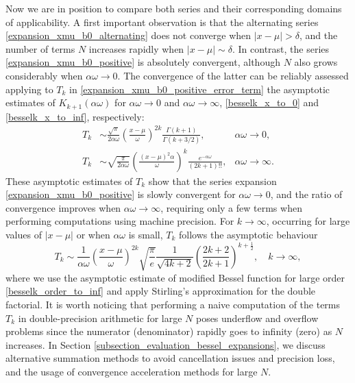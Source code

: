 \documentclass[10pt,a4paper,oneside]{article}
\numberwithin{equation}{section}
\begin{document}
Now we are in position to compare both series and their corresponding domains of applicability. A first important observation is that the alternating series \eqref{expansion_xmu_b0_alternating} does not converge when $|x - \mu| > \delta$, and the number of terms $N$ increases rapidly when $|x - \mu| \sim \delta$. In contrast, the series \eqref{expansion_xmu_b0_positive} is absolutely convergent, although $N$ also grows considerably when $\alpha\omega \to 0$. The convergence of the latter can be reliably assessed applying to $T_k$ in \eqref{expansion_xmu_b0_positive_error_term} the asymptotic estimates of $K_{k+1}(\alpha\omega)$ for $\alpha \omega \to 0$ and $\alpha \omega \to \infty$, \eqref{besselk_x_to_0} and \eqref{besselk_x_to_inf}, respectively:
\begin{align*}
T_k &\sim \frac{\sqrt{\pi}}{2\alpha\omega} \left(\frac{x-\mu}{\omega}\right)^{2k}\frac{\Gamma(k + 1)}{\Gamma(k + 3/2)}, & \alpha\omega \to 0,\\
T_k &\sim \sqrt{\frac{\pi}{2\alpha \omega}} \left(\frac{(x-\mu)^2\alpha}{\omega}\right)^k \frac{e^{-\alpha \omega}}{(2k + 1)!!}, &\alpha\omega \to \infty.
\end{align*}
These asymptotic estimates of $T_k$ show that the series expansion \eqref{expansion_xmu_b0_positive} is slowly convergent for $\alpha\omega \to 0$, and the ratio of convergence improves when $\alpha\omega \to \infty$, requiring only a few terms when performing computations using machine precision. For $k \to \infty$, occurring for large values of $|x-\mu|$ or when $\alpha\omega$ is small, $T_k$ follows the asymptotic behaviour
\begin{equation*}
T_k \sim \frac{1}{\alpha\omega}\left(\frac{x-\mu}{\omega}\right)^{2k}\sqrt{\frac{\pi}{e}}\frac{1}{\sqrt{4k + 2}}\left(\frac{2k + 2}{2k + 1}\right)^{k + \frac{1}{2}}, \quad k \to \infty,
\end{equation*}
where we use the asymptotic estimate of modified Bessel function for large order \eqref{besselk_order_to_inf} and apply Stirling's approximation for the double factorial.
It is worth noticing that performing a naive computation of the terms $T_k$ in double-precision arithmetic for large $N$ poses underflow and overflow problems since the numerator (denominator) rapidly goes to infinity (zero) as $N$ increases. In Section \ref{subsection_evaluation_bessel_expansions}, we discuss alternative summation methods to avoid cancellation issues and precision loss, and the usage of convergence acceleration methods for large $N$.
\end{document}
